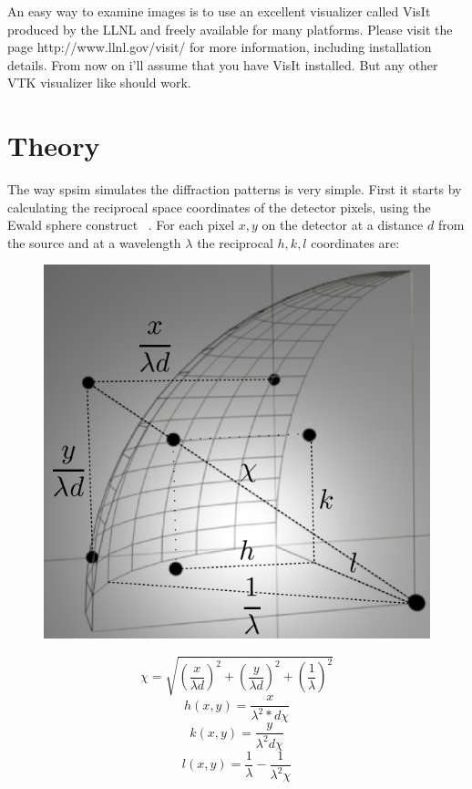 \documentclass{report}
\begin{document}
An easy way to examine images is to use an excellent visualizer called VisIt produced by the LLNL
and freely available for many platforms. Please visit the page http://www.llnl.gov/visit/ for
more information, including installation details. From now on i'll assume that you have VisIt installed.
But any other VTK visualizer like should work.

\chapter{Theory}
The way spsim simulates the diffraction patterns is very simple. First it starts by calculating the reciprocal space coordinates
of the detector pixels, using the Ewald sphere construct ~\cite{Giacovazzo92}.
For each pixel $x,y$ on the detector at a distance $d$ from the source and at a wavelength $\lambda$ the reciprocal $h,k,l$ coordinates are:

\begin{figure}[!h]
\centering
\includegraphics[scale=0.3]{ewald.png}
\label{ewald-construction}
\end{figure}


\begin{equation}
\chi = \sqrt{(\frac{x}{\lambda d})^2+(\frac{y}{\lambda d})^2+(\frac{1}{\lambda})^2}
\end{equation}
\begin{equation}
h(x,y) = \frac{x}{\lambda^2* d \chi}
\end{equation}
\begin{equation}
k(x,y) = \frac{y}{\lambda^2 d \chi}
\end{equation}
\begin{equation}
l(x,y) = \frac{1}{\lambda} - \frac{1}{\lambda^2\chi}
\end{equation}
\end{document}
